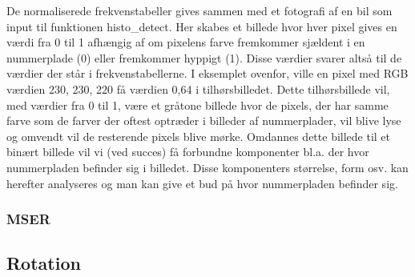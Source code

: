 De normaliserede frekvenstabeller gives sammen med et fotografi af en bil som input til funktionen histo\_detect. Her skabes et billede hvor hver pixel gives en værdi fra 0 til 1 afhængig af om pixelens farve fremkommer sjældent i en nummerplade (0) eller fremkommer hyppigt (1). Disse værdier svarer altså til de værdier der står i frekvenstabellerne. I eksemplet ovenfor, ville en pixel med RGB værdien 230, 230, 220 få værdien 0,64 i tilhørsbilledet. Dette tilhørsbillede vil, med værdier fra 0 til 1, være et gråtone billede hvor de pixels, der har samme farve som de farver der oftest optræder i billeder af nummerplader, vil blive lyse og omvendt vil de resterende pixels blive mørke. Omdannes dette billede til et binært billede vil vi (ved succes) få forbundne komponenter bl.a. der hvor nummerpladen befinder sig i billedet. Disse komponenters størrelse, form osv. kan herefter analyseres og man kan give et bud på hvor nummerpladen befinder sig.


\subsubsection*{MSER}
\begin{comment}
Først sorteres alle pixels intensiteter (stigende). Dette gøres ved brug af bucket sort.
\end{commen}

\subsubsection{Signatur metode (kwasnickawawryniak.pdf)}

\subsubsection{Andre metoder brugt i litteraturen, som der skal diskuteres?}
\begin{comment}
\cite{parker} bruger kant-detektion og localisering af tegn til at give et bud på hvor nummerpladen er.
\end{comment}

\subsection{Rotation}
\begin{comment}
Nogle overvejelser om hvordan billedet skal være klippet til for at rotationen fungerer ordentligt...

I dette afsnit beskrives det hvordan et billede af en nummerplade kan roteres, så nummerpladen optræder vandret i billedet.


\end{comment}

